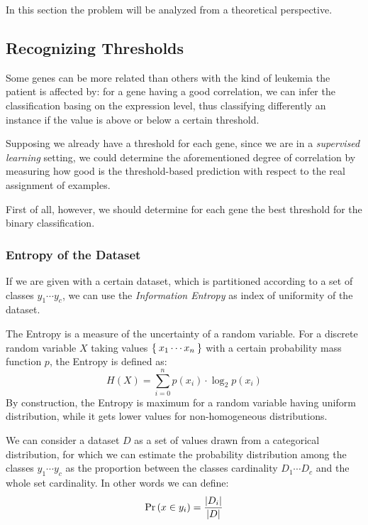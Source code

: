 In this section the problem will be analyzed from a theoretical
perspective.

\subsection{ Recognizing Thresholds } \label{sub:Thresholds}

    Some genes can be more related than others with the kind of leukemia
    the patient is affected by: for a gene having a good correlation, we
    can infer the classification basing on the expression level, thus
    classifying differently an instance if the value is above or below a
    certain threshold.

    Supposing we already have a threshold for each gene, since we are in a
    \emph{supervised learning} setting, we could determine the
    aforementioned degree of correlation by measuring how good is the
    threshold-based prediction with respect to the real assignment
    of examples.

    First of all, however, we should determine for each gene the best
    threshold for the binary classification.

    \subsubsection{ Entropy of the Dataset }

        If we are given with a certain dataset, which is partitioned
        according to a set of classes $y_1 \cdots y_c$, we can use the
        \emph{Information Entropy} as index of uniformity of the dataset.

        The Entropy is a measure of the uncertainty of a random variable.
        For a discrete random variable $X$ taking values $\Set{ x_1 \cdots
        x_n }$ with a certain probability mass function $p$, the Entropy
        is defined as:
        \[
        H(X) = \sum_{i = 0}^n p(x_i) \cdot \log_2{p(x_i)}
        \]
        By construction, the Entropy is maximum for a random variable
        having uniform distribution, while it gets lower values for
        non-homogeneous distributions.

        We can consider a dataset $D$ as a set of values drawn from a
        categorical distribution, for which we can estimate the
        probability distribution among the classes $y_1 \cdots y_c$ as the
        proportion between the classes cardinality $D_1 \cdots D_c$ and
        the whole set cardinality. In other words we can define:
        \[
        \mbox{Pr}\left({x \in y_i}\right) = \frac{ \left|{D_i}\right| }{ \left|{D}\right| }
        \]


